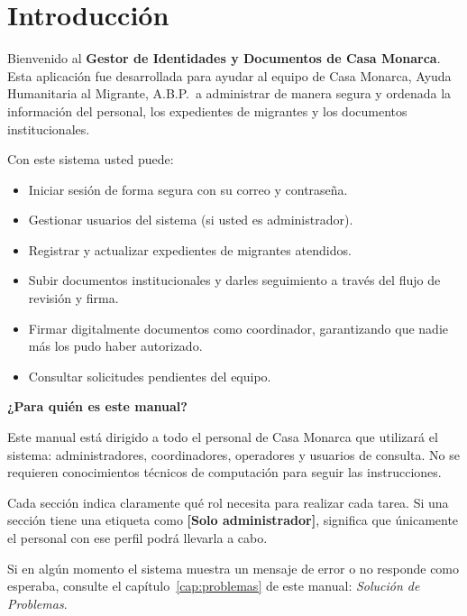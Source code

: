 \documentclass[10pt,letterpaper]{report}
\begin{document}
\tableofcontents
\listoftables
\listoffigures
\clearpage
{}

\chapter{Introducción}

Bienvenido al \textbf{Gestor de Identidades y Documentos de Casa Monarca}. Esta aplicación fue desarrollada para ayudar al equipo de Casa Monarca, Ayuda Humanitaria al Migrante, A.B.P.\ a administrar de manera segura y ordenada la información del personal, los expedientes de migrantes y los documentos institucionales.

Con este sistema usted puede:

\begin{itemize}
  \item Iniciar sesión de forma segura con su correo y contraseña.
  \item Gestionar usuarios del sistema (si usted es administrador).
  \item Registrar y actualizar expedientes de migrantes atendidos.
  \item Subir documentos institucionales y darles seguimiento a través del flujo de revisión y firma.
  \item Firmar digitalmente documentos como coordinador, garantizando que nadie más los pudo haber autorizado.
  \item Consultar solicitudes pendientes del equipo.
\end{itemize}

\textbf{¿Para quién es este manual?}

Este manual está dirigido a todo el personal de Casa Monarca que utilizará el sistema: administradores, coordinadores, operadores y usuarios de consulta. No se requieren conocimientos técnicos de computación para seguir las instrucciones.

Cada sección indica claramente qué rol necesita para realizar cada tarea. Si una sección tiene una etiqueta como \textbf{[Solo administrador]}, significa que únicamente el personal con ese perfil podrá llevarla a cabo.

\begin{consejobox}
Si en algún momento el sistema muestra un mensaje de error o no responde como esperaba, consulte el capítulo~\ref{cap:problemas} de este manual: \textit{Solución de Problemas}.
\end{consejobox}
\end{document}
